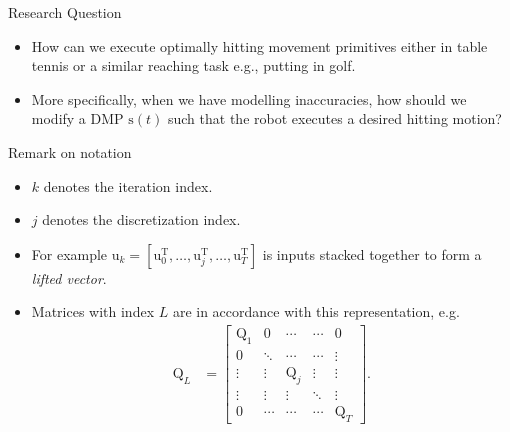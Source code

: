 \documentclass[handout]{beamer}
\newcommand{\boldvec}[1]{\boldsymbol{\mathrm{#1}}}
\let\vec\boldvec
\newcommand{\dmp}{\vec{s}} %
\newcommand{\sysInput}{\vec{u}} %
\begin{document}
%
\begin{frame}{Research Question}
\begin{itemize}
\item How can we execute optimally hitting movement primitives either in table tennis or a similar reaching task e.g., putting in golf. 
%
\item More specifically, when we have modelling inaccuracies, how should we modify a DMP $\dmp(t)$ such that the robot executes a desired hitting motion?
\end{itemize}
\end{frame}
%
\begin{frame}{Remark on notation}
\begin{itemize}
\item $k$ denotes the iteration index.
\item $j$ denotes the discretization index.
\item For example $\sysInput_k = [\sysInput_0^{\mathrm{T}}, \ldots, \sysInput_j^{\mathrm{T}}, \ldots, \sysInput_T^{\mathrm{T}}]$ is inputs stacked  together to form a \emph{lifted vector}.
\item Matrices with index $L$ are in accordance with this representation, e.g. \begin{equation*}
\begin{aligned}
 \vec{Q}_L &= 
 \begin{bmatrix}
  \vec{Q}_{1} & \vec{0} & \cdots & \cdots & \vec{0} \\
  \vec{0} & \ddots & \cdots & \cdots & \vdots \\
  \vdots  & \vdots  & \vec{Q}_{j} & \vdots & \vdots \\
  \vdots  & \vdots  & \vdots & \ddots & \vdots \\
  \vec{0} & \cdots & \cdots & \cdots & \vec{Q}_T
 \end{bmatrix}.
\end{aligned}
\end{equation*}
\end{itemize}
\end{frame}
%
\end{document}
